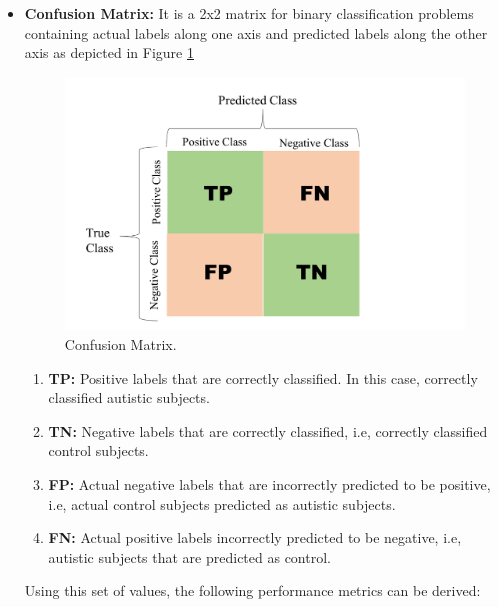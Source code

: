\begin{itemize}
    \item \textbf{Confusion Matrix:} It is a 2x2 matrix for binary classification problems containing
actual labels along one axis and predicted labels along the other axis as depicted in Figure \ref{fig:4.4}

\begin{figure}[h!]
\centering
\includegraphics[width=\linewidth]{figures/Figure 4.4.png}
\caption{Confusion Matrix.}
\label{fig:4.4}
\end{figure}

\begin{enumerate}
    \item \textbf{TP:} Positive labels that are correctly classified. In this case, correctly classified autistic
subjects.
\item \textbf{TN:} Negative labels that are correctly classified, i.e, correctly classified control subjects.

\item \textbf{FP:} Actual negative labels that are incorrectly predicted to be positive, i.e, actual
control subjects predicted as autistic subjects.

\item \textbf{FN:} Actual positive labels incorrectly predicted to be negative, i.e, autistic
subjects that are predicted as control.

\end{enumerate}
Using this set of values, the following performance metrics can be derived:



\end{itemize}
